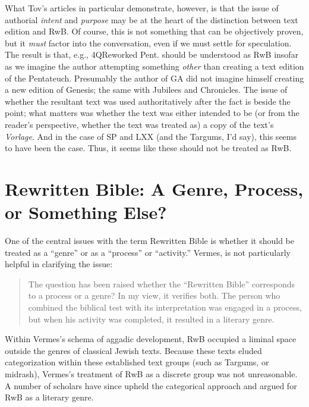 What Tov's articles in particular demonstrate, however, is that the
issue of authorial \emph{intent} and \emph{purpose} may be at the heart
of the distinction between text edition and RwB. Of course, this is not
something that can be objectively proven, but it \emph{must} factor into
the conversation, even if we must settle for speculation. The result is
that, e.g., 4QReworked Pent. should be understood as RwB insofar as we
imagine the author attempting something \emph{other} than creating a
text edition of the Pentateuch. Presumably the author of GA did not
imagine himself creating a new edition of Genesis; the same with
Jubilees and Chronicles. The issue of whether the resultant text was
used authoritatively after the fact is beside the point; what matters
was whether the text was either intended to be (or from the reader's
perspective, whether the text was treated as) a copy of the text's
\emph{Vorlage}. And in the case of SP and LXX (and the Targums, I'd
say), this seems to have been the case. Thus, it seems like these should
not be treated as RwB.

\section{Rewritten Bible: A Genre, Process, or Something
Else?}\label{rwb-a-genre-process-or-something-else}

One of the central issues with the term Rewritten Bible is whether it
should be treated as a ``genre'' or as a ``process'' or ``activity.''
Vermes, is not particularly helpful in clarifying the issue:

\begin{quote}
The question has been raised whether the ``Rewritten Bible'' corresponds
to a process or a genre? In my view, it verifies both. The person who
combined the biblical test with its interpretation was engaged in a
process, but when his activity was completed, it resulted in a literary
genre.\autocite[8]{vermes_zsengeller2014}
\end{quote}

Within Vermes's schema of aggadic development, RwB occupied a liminal
space outside the genres of classical Jewish texts. Because these texts
eluded categorization within these established text groups (such as
Targums, or midrash), Vermes's treatment of RwB as a discrete group was
not unreasonable. A number of scholars have since upheld the categorical
approach and argued for RwB as a literary genre.

